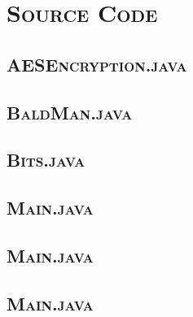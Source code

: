 \documentclass[12pt]{article}
\begin{document}
	\section[Source Code]{\Large{}\selectfont\scshape Source Code}
	
	\subsection[AESEncryption]{\hspace*{1em}\large{}\selectfont\scshape AESEncryption.java}
	
	
	\subsection[BaldMan]{\hspace*{1em}\large{}\selectfont\scshape BaldMan.java}
	
	
	\subsection[Bits]{\hspace*{1em}\large{}\selectfont\scshape Bits.java}
	
	
	\subsection[Main]{\hspace*{1em}\large{}\selectfont\scshape Main.java}
	
        
        \subsection[TCPClientFile]{\hspace*{1em}\large{}\selectfont\scshape Main.java}
	
        
        \subsection[TCPClientFile]{\hspace*{1em}\large{}\selectfont\scshape Main.java}
	
	
\end{document}
